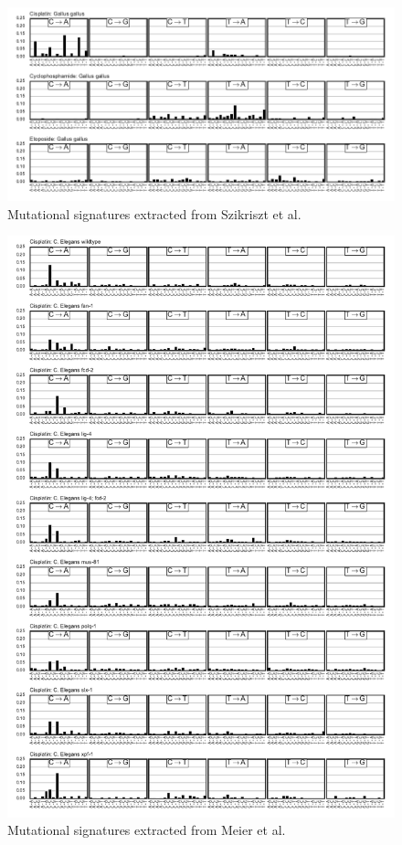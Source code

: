 \begin{figure}
\centering
\includegraphics[scale=1.0]{figures/extracted_signatures_chicken.pdf}
\caption{Mutational signatures extracted from Szikriszt et al.~\cite{Szikriszt_2016}}
\label{fig:supp_extracted_signatures_chicken}
\end{figure}

\begin{figure}
\centering
\includegraphics[scale=1.0]{figures/extracted_signatures_worm.pdf}
\caption{Mutational signatures extracted from Meier et al.~\cite{Meier_2014}}
\label{fig:supp_extracted_signatures_worm}
\end{figure}

\FloatBarrier
